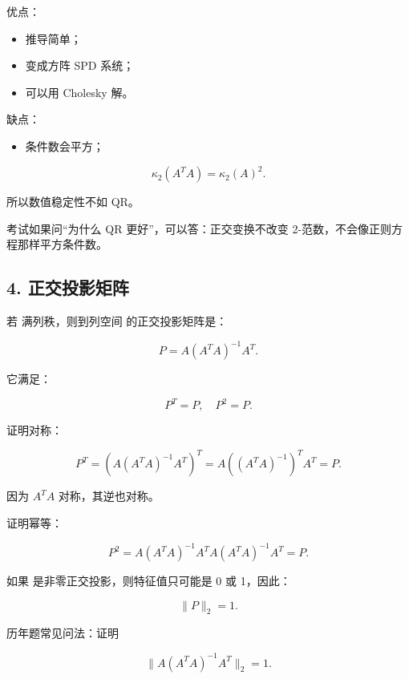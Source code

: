 \documentclass[11pt,a4paper]{ctexart}
\newcommand{\code}[1]{\begingroup\ttfamily\small #1\endgroup}
\begin{document}

优点：

\begin{itemize}

\item 推导简单；

\item 变成方阵 SPD 系统；

\item 可以用 Cholesky 解。

\end{itemize}

缺点：

\begin{itemize}

\item 条件数会平方；

\end{itemize}

\[
\kappa_2(A^TA)=\kappa_2(A)^2.
\]

所以数值稳定性不如 QR。

考试如果问“为什么 QR 更好”，可以答：正交变换不改变 2-范数，不会像正则方程那样平方条件数。


\subsection*{4. 正交投影矩阵}


若 \code{} 满列秩，则到列空间 \code{} 的正交投影矩阵是：

\[
P=A(A^TA)^{-1}A^T.
\]

它满足：

\[
P^T=P,\quad P^2=P.
\]

证明对称：

\[
P^T=(A(A^TA)^{-1}A^T)^T
=A((A^TA)^{-1})^TA^T=P.
\]

因为 $A^TA$ 对称，其逆也对称。

证明幂等：

\[
P^2=A(A^TA)^{-1}A^TA(A^TA)^{-1}A^T=P.
\]

如果 \code{} 是非零正交投影，则特征值只可能是 0 或 1，因此：

\[
\|P\|_2=1.
\]

历年题常见问法：证明

\[
\|A(A^TA)^{-1}A^T\|_2=1.
\]
\end{document}
